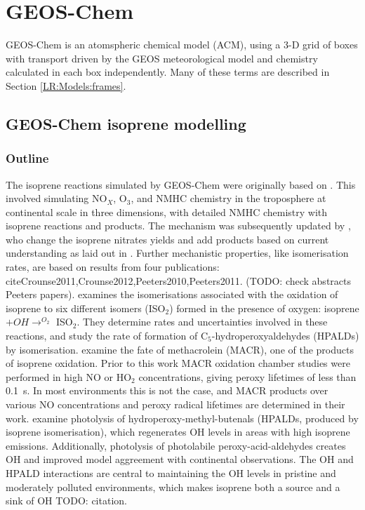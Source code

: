 \section{GEOS-Chem}
  \label{Model:GC}
  GEOS-Chem is an atomspheric chemical model (ACM), using a 3-D grid of boxes with transport driven by the GEOS meteorological model and chemistry calculated in each box independently. 
  Many of these terms are described in Section \ref{LR:Models:frames}.


  \subsection{GEOS-Chem isoprene modelling}
  \label{Model:GC:Isop}
    \subsubsection{Outline}
      The isoprene reactions simulated by GEOS-Chem were originally based on \cite{Horowitz1998}.
      This involved simulating NO$_X$, O$_3$, and NMHC chemistry in the troposphere at continental scale in three dimensions, with detailed NMHC chemistry with isoprene reactions and products.
      The mechanism was subsequently updated by \citet{Mao2013}, who change the isoprene nitrates yields and add products based on current understanding as laid out in \citet{Paulot2009a,Paulot2009b}.
      Further mechanistic properties, like isomerisation rates, are based on results from four publications: cite{Crounse2011,Crounse2012,Peeters2010,Peeters2011}.
      (TODO: check abstracts Peeters papers).
      \cite{Crounse2011} examines the isomerisations associated with the oxidation of isoprene to six different isomers (ISO$_2$) formed in the presence of oxygen: isoprene $ + OH \rightarrow^{O_2} $ ISO$_2$.
      They determine rates and uncertainties involved in these reactions, and study the rate of formation of C$_5$-hydroperoxyaldehydes (HPALDs) by isomerisation.
      \cite{Crounse2012} examine the fate of methacrolein (MACR), one of the products of isoprene oxidation. 
      Prior to this work MACR oxidation chamber studies were performed in high NO or HO$_2$ concentrations, giving peroxy lifetimes of less than 0.1~s.
      In most environments this is not the case, and MACR products over various NO concentrations and peroxy radical lifetimes are determined in their work.
      \cite{Peeters2010} examine photolysis of hydroperoxy-methyl-butenals (HPALDs, produced by isoprene isomerisation), which regenerates OH levels in areas with high isoprene emissions.
      Additionally, photolysis of photolabile peroxy-acid-aldehydes creates OH and improved model aggreement with continental observations.
      The OH and HPALD interactions are central to maintaining the OH levels in pristine and moderately polluted environments, which makes isoprene both a source and a sink of OH TODO: citation.
      
